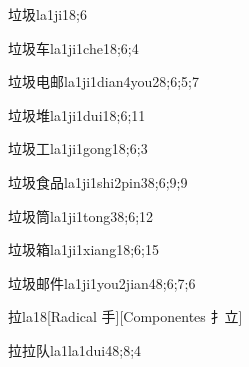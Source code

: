 
\begin{verbete}{垃圾}{la1ji1}{8;6}
\end{verbete}

\begin{verbete}{垃圾车}{la1ji1che1}{8;6;4}
\end{verbete}

\begin{verbete}{垃圾电邮}{la1ji1dian4you2}{8;6;5;7}
\end{verbete}

\begin{verbete}{垃圾堆}{la1ji1dui1}{8;6;11}
\end{verbete}

\begin{verbete}{垃圾工}{la1ji1gong1}{8;6;3}
\end{verbete}

\begin{verbete}{垃圾食品}{la1ji1shi2pin3}{8;6;9;9}
\end{verbete}

\begin{verbete}{垃圾筒}{la1ji1tong3}{8;6;12}
\end{verbete}

\begin{verbete}{垃圾箱}{la1ji1xiang1}{8;6;15}
\end{verbete}

\begin{verbete}{垃圾邮件}{la1ji1you2jian4}{8;6;7;6}
\end{verbete}

\begin{verbete}{拉}{la1}{8}[Radical 手][Componentes 扌立]
\end{verbete}

\begin{verbete}{拉拉队}{la1la1dui4}{8;8;4}
\end{verbete}

